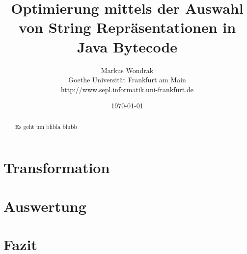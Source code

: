 \documentclass[12pt]{report}
\title{Optimierung mittels der Auswahl von String Repräsentationen in Java Bytecode}
\author{Markus Wondrak\\Goethe Universität Frankfurt am Main\\http://www.sepl.informatik.uni-frankfurt.de}
\date{\today}
\begin{document}
\maketitle
{}
\tableofcontents
\listoffigures
\listoftables

\begin{abstract}
Es geht um blibla blubb
\end{abstract}






\chapter{Transformation}

\chapter{Auswertung}

\chapter{Fazit}
\end{document}

